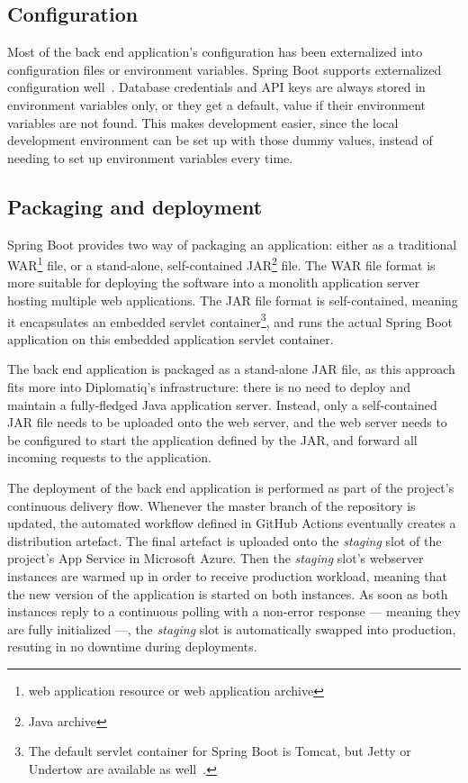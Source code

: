 \subsection{Configuration}

Most of the back end application's configuration has been externalized into configuration files or environment variables. Spring Boot supports externalized configuration well~\cite{spring-boot-reference-docs}. Database credentials and API keys are always stored in environment variables only, or they get a default,  value if their environment variables are not found. This makes development easier, since the local development environment can be set up with those dummy values, instead of needing to set up environment variables every time.

\subsection{Packaging and deployment}

Spring Boot provides two way of packaging an application: either as a traditional WAR\footnote{web application resource or web application archive} file, or a stand-alone, self-contained JAR\footnote{Java archive} file. The WAR file format is more suitable for deploying the software into a monolith application server hosting multiple web applications. The JAR file format is self-contained, meaning it encapsulates an embedded servlet container\footnote{The default servlet container for Spring Boot is Tomcat, but Jetty or Undertow are available as well~\cite{spring-boot-reference-docs}.}, and runs the actual Spring Boot application on this embedded application servlet container.

The back end application is packaged as a stand-alone JAR file, as this approach fits more into Diplomatiq's infrastructure: there is no need to deploy and maintain a fully-fledged Java application server. Instead, only a self-contained JAR file needs to be uploaded onto the web server, and the web server needs to be configured to start the application defined by the JAR, and forward all incoming requests to the application.

The deployment of the back end application is performed as part of the project's continuous delivery flow. Whenever the master branch of the repository is updated, the automated workflow defined in GitHub Actions eventually creates a distribution artefact. The final artefact is uploaded onto the \emph{staging} slot of the project's App Service in Microsoft Azure. Then the \emph{staging} slot's webserver instances are warmed up in order to receive production workload, meaning that the new version of the application is started on both instances. As soon as both instances reply to a continuous polling with a non-error response — meaning they are fully initialized —, the \emph{staging} slot is automatically swapped into production, resuting in no downtime during deployments.

